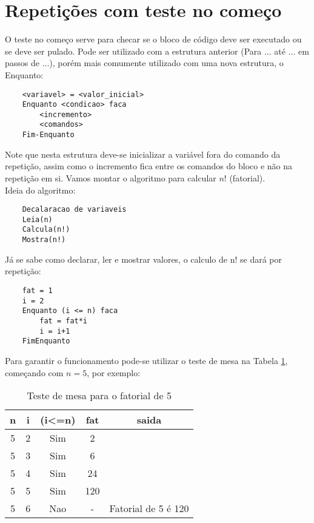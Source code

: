 \section{Repetições com teste no começo}
O teste no começo serve para checar se o bloco de código deve ser executado ou se deve ser pulado. Pode ser utilizado com a estrutura anterior (Para ... até ... em passos de ...), porém mais comumente utilizado com uma nova estrutura, o Enquanto: \\
\begin{lstlisting}
    <variavel> = <valor_inicial>
    Enquanto <condicao> faca
        <incremento>
        <comandos>
    Fim-Enquanto
\end{lstlisting}
Note que nesta estrutura deve-se inicializar a variável fora do comando da repetição, assim como o incremento fica entre os comandos do bloco e não na repetição em si. Vamos montar o algoritmo para calcular $n!$ (fatorial). \\
Ideia do algoritmo:
\begin{lstlisting}
    Decalaracao de variaveis
    Leia(n)
    Calcula(n!)
    Mostra(n!)
\end{lstlisting}
Já se sabe como declarar, ler e mostrar valores, o calculo de n! se dará por repetição:
\begin{lstlisting}
    fat = 1
    i = 2
    Enquanto (i <= n) faca
        fat = fat*i
        i = i+1
    FimEnquanto
\end{lstlisting}
Para garantir o funcionamento pode-se utilizar o teste de mesa na Tabela \ref{tab:testefatorial}, começando com $n = 5$, por exemplo:
\begin{table}[!h]
    \centering
    \caption{Teste de mesa para o fatorial de 5}
    \label{tab:testefatorial}
    \begin{tabular}{ccccc} \hline \hline
    n & i & (i\textless=n) & fat & saida               \\ \hline
    5 & 2 & Sim            & 2   &                     \\
    5 & 3 & Sim            & 6   &                     \\
    5 & 4 & Sim            & 24  &                     \\
    5 & 5 & Sim            & 120 &                     \\
    5 & 6 & Nao            & -   & Fatorial de 5 é 120 \\ \hline \hline
    \end{tabular}
    \end{table}

